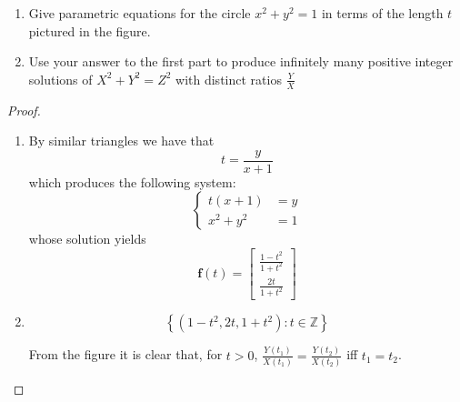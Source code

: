 \begin{exercise} \label{e2.1.2}
    \begin{enumerate}
        \item Give parametric equations for the circle \( x^2 + y^2 = 1 \) in terms of the length \( t \) pictured in the figure.
        
        \item Use your answer to the first part to produce infinitely many positive integer solutions of \( X^2 + Y^2 = Z^2 \) with distinct ratios \( \frac{Y}{X} \)
    \end{enumerate}
    
    \begin{center}
    \end{center}
    
    \begin{proof}
        \begin{enumerate}
            \item By similar triangles we have that 
            \[ t = \frac{y}{x+1} \]
            which produces the following system:
            \[ \begin{cases} t(x+1) &= y \\ x^2 + y^2 &= 1 \end{cases} \]
            whose solution yields
            \[ \mathbf{f}(t) = \begin{bmatrix} \frac{1-t^2}{1+t^2} \\ \frac{2t}{1+t^2} \end{bmatrix} \]
            
            \item \[ \left\{ \left( 1-t^2, 2t, 1+t^2 \right): t \in \mathbb{Z} \right\} \]
            
            From the figure it is clear that, for \( t > 0 \), \( \frac{Y(t_1)}{X(t_1)} = \frac{Y(t_2)}{X(t_2)} \) iff \( t_1 = t_2 \).
        \end{enumerate}
    \end{proof}
\end{exercise}

